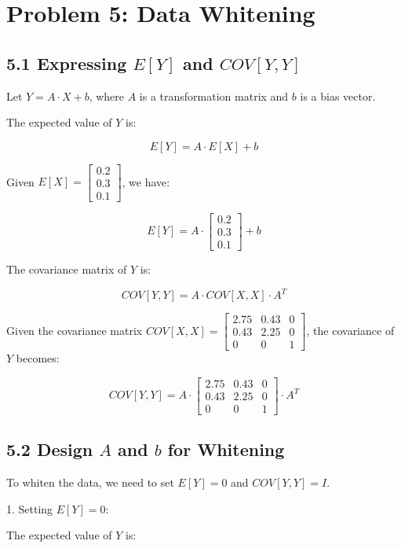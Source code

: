 \documentclass{article}
\begin{document}
\section*{Problem 5: Data Whitening}

\subsection*{5.1 Expressing \(E[Y]\) and \(COV[Y,Y]\)}

Let \(Y = A \cdot X + b\), where \(A\) is a transformation matrix and \(b\) is a bias vector.

The expected value of \(Y\) is:

\[
E[Y] = A \cdot E[X] + b
\]

Given \(E[X] = \begin{bmatrix} 0.2 \\ 0.3 \\ 0.1 \end{bmatrix}\), we have:

\[
E[Y] = A \cdot \begin{bmatrix} 0.2 \\ 0.3 \\ 0.1 \end{bmatrix} + b
\]

The covariance matrix of \(Y\) is:

\[
COV[Y,Y] = A \cdot COV[X,X] \cdot A^T
\]

Given the covariance matrix \(COV[X,X] = \begin{bmatrix} 
2.75 & 0.43 & 0 \\ 
0.43 & 2.25 & 0 \\ 
0 & 0 & 1 
\end{bmatrix}\), the covariance of \(Y\) becomes:

\[
COV[Y,Y] = A \cdot \begin{bmatrix} 
2.75 & 0.43 & 0 \\ 
0.43 & 2.25 & 0 \\ 
0 & 0 & 1 
\end{bmatrix} \cdot A^T
\]

\subsection*{5.2 Design \(A\) and \(b\) for Whitening}

To whiten the data, we need to set \(E[Y] = 0\) and \(COV[Y,Y] = I\).

1. Setting \(E[Y] = 0\):

The expected value of \(Y\) is:
\end{document}
